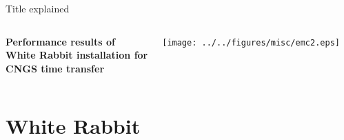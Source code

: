 \documentclass[compress,red]{beamer}
\begin{document}
\begin{frame}{Title explained}

\begin{columns}[c]
    \begin{center}
	\textbf{Performance results of \\White Rabbit installation for \\CNGS time transfer}
    \end{center}
    \begin{center}
      \texttt{[image: ../../figures/misc/emc2.eps]}
    \end{center}
\end{columns}

\end{frame}
\section{White Rabbit}
\end{document}
